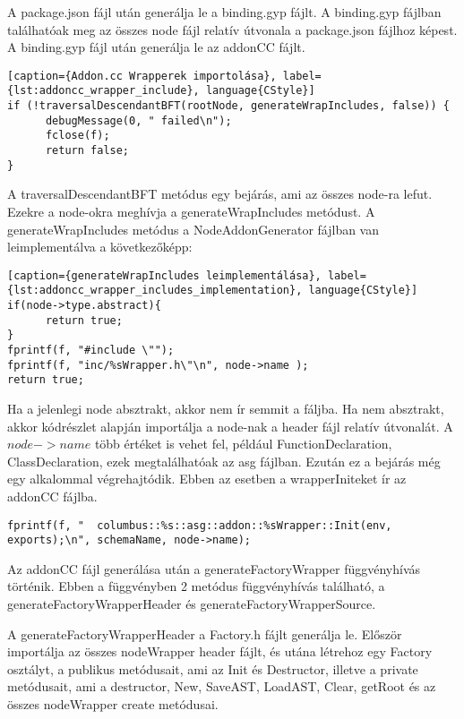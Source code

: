 \noindent

A package.json fájl után generálja le a binding.gyp fájlt.
A binding.gyp fájlban találhatóak meg az összes node fájl relatív útvonala a package.json fájlhoz képest.
A binding.gyp fájl után generálja le az addonCC fájlt.

\begin{lstlisting}[caption={Addon.cc Wrapperek importolása}, label={lst:addoncc_wrapper_include}, language{CStyle}]
if (!traversalDescendantBFT(rootNode, generateWrapIncludes, false)) {
      debugMessage(0, " failed\n");
      fclose(f);
      return false;
}
\end{lstlisting}

A traversalDescendantBFT metódus egy bejárás, ami az összes node-ra lefut. Ezekre a node-okra meghívja a generateWrapIncludes metódust.
A generateWrapIncludes metódus a NodeAddonGenerator fájlban van leimplementálva a következőképp:

\begin{lstlisting}[caption={generateWrapIncludes leimplementálása}, label={lst:addoncc_wrapper_includes_implementation}, language{CStyle}]
if(node->type.abstract){
      return true;
}
fprintf(f, "#include \"");
fprintf(f, "inc/%sWrapper.h\"\n", node->name );
return true;
\end{lstlisting}

Ha a jelenlegi node absztrakt, akkor nem ír semmit a fáljba.
Ha nem absztrakt, akkor  kódrészlet alapján importálja a node-nak a header fájl relatív útvonalát.
A $node->name$ több értéket is vehet fel, például FunctionDeclaration, ClassDeclaration, ezek megtalálhatóak az asg fájlban.
Ezután ez a bejárás még egy alkalommal végrehajtódik. Ebben az esetben a wrapperIniteket ír az addonCC fájlba.

\begin{lstlisting}[caption={generateWrapInit leimplementálása}, label={lst:addoncc_wrapper_inits_implementation}, language={CStyle}]
fprintf(f, "  columbus::%s::asg::addon::%sWrapper::Init(env, exports);\n", schemaName, node->name);
\end{lstlisting}

\noindent

Az addonCC fájl generálása után a generateFactoryWrapper függvényhívás történik.
Ebben a függvényben 2 metódus függvényhívás található, a generateFactoryWrapperHeader és generateFactoryWrapperSource.

\noindent

A generateFactoryWrapperHeader a Factory.h fájlt generálja le.
Először importálja az összes nodeWrapper header fájlt, és utána létrehoz egy Factory osztályt, a publikus metódusait, ami az Init és Destructor, illetve a private metódusait,
ami a destructor, New, SaveAST, LoadAST, Clear, getRoot és az összes nodeWrapper create metódusai.

